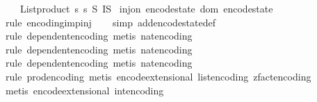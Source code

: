 \begin{isabellebody}
\ \ \ \ {\isacharparenleft}{\kern0pt}List{\isachardot}{\kern0pt}product\ {\isacharbrackleft}{\kern0pt}{}{\isachardot}{\kern0pt}{\isachardot}{\kern0pt}{\isacharless}{\kern0pt}s\ {\isacharbrackleft}{\kern0pt}{}{\isachardot}{\kern0pt}{\isachardot}{\kern0pt}{\isacharless}{\kern0pt}s\ {\isasymrightarrow}\isactrlsub S\ I\isactrlsub S{\isacharparenright}{\kern0pt}{\isacharparenright}{\kern0pt}{\isacharparenright}{\kern0pt}{\isacharparenright}{\kern0pt}{\isachardoublequoteclose}\isanewline
\isanewline
{}\isamarkupfalse%
\ {\isachardoublequoteopen}inj{\isacharunderscore}{\kern0pt}on\ encode{\isacharunderscore}{\kern0pt}state\ {\isacharparenleft}{\kern0pt}dom\ encode{\isacharunderscore}{\kern0pt}state{\isacharparenright}{\kern0pt}{\isachardoublequoteclose}\isanewline
%
\isadelimproof
\ \ %
\endisadelimproof
%
\isatagproof
{}\isamarkupfalse%
\ {\isacharparenleft}{\kern0pt}rule\ encoding{\isacharunderscore}{\kern0pt}imp{\isacharunderscore}{\kern0pt}inj{\isacharparenright}{\kern0pt}\isanewline
\ \ \isamarkupfalse%
\ {\isacharparenleft}{\kern0pt}simp\ add{\isacharcolon}{\kern0pt}encode{\isacharunderscore}{\kern0pt}state{\isacharunderscore}{\kern0pt}def{\isacharparenright}{\kern0pt}\isanewline
\ \ \isamarkupfalse%
\ {\isacharparenleft}{\kern0pt}rule\ dependent{\isacharunderscore}{\kern0pt}encoding{\isacharcomma}{\kern0pt}\ metis\ nat{\isacharunderscore}{\kern0pt}encoding{\isacharparenright}{\kern0pt}\isanewline
\ \ \isamarkupfalse%
\ {\isacharparenleft}{\kern0pt}rule\ dependent{\isacharunderscore}{\kern0pt}encoding{\isacharcomma}{\kern0pt}\ metis\ nat{\isacharunderscore}{\kern0pt}encoding{\isacharparenright}{\kern0pt}\isanewline
\ \ \isamarkupfalse%
\ {\isacharparenleft}{\kern0pt}rule\ dependent{\isacharunderscore}{\kern0pt}encoding{\isacharcomma}{\kern0pt}\ metis\ nat{\isacharunderscore}{\kern0pt}encoding{\isacharparenright}{\kern0pt}\isanewline
\ \ \isamarkupfalse%
\ {\isacharparenleft}{\kern0pt}rule\ prod{\isacharunderscore}{\kern0pt}encoding{\isacharcomma}{\kern0pt}\ metis\ encode{\isacharunderscore}{\kern0pt}extensional\ list{\isacharunderscore}{\kern0pt}encoding\ zfact{\isacharunderscore}{\kern0pt}encoding{\isacharparenright}{\kern0pt}\isanewline
\ \ \isamarkupfalse%
\ {\isacharparenleft}{\kern0pt}metis\ encode{\isacharunderscore}{\kern0pt}extensional\ int{\isacharunderscore}{\kern0pt}encoding{\isacharparenright}{\kern0pt}%

\end{isabellebody}
